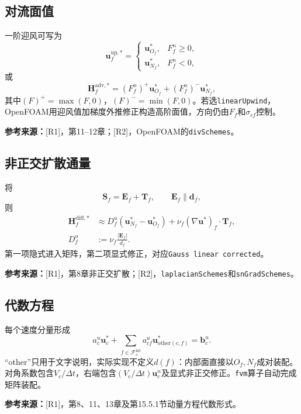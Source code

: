 \documentclass[UTF8,12pt,a4paper]{ctexart}
\numberwithin{equation}{section}
\newcommand{\dt}{\Delta t}
\newcommand{\Rone}{\textnormal{[R1]}}
\newcommand{\Rtwo}{\textnormal{[R2]}}
\newcommand{\source}[1]{\par\smallskip\noindent\colorbox{sourcebg}{%
  \parbox{0.955\linewidth}{\footnotesize\color{sourcegray}\textbf{参考来源：}#1}}\par\smallskip}
\begin{document}
\subsection{对流面值}
一阶迎风可写为
\begin{equation}
  \bm u_f^{\mathrm{up},*}=
  \begin{cases}
    \bm u_{O_f}^*,&F_f^n\ge0,\\
    \bm u_{N_f}^*,&F_f^n<0,
  \end{cases}
\end{equation}
或
\begin{equation}
  \boxed{\bm H_f^{\mathrm{adv},*}
  =(F_f^n)^+\bm u_{O_f}^*+(F_f^n)^-\bm u_{N_f}^*,}
  \label{eq:upwind_momentum_flux}
\end{equation}
其中$(F)^+=\max(F,0)$，$(F)^-=\min(F,0)$。若选\texttt{linearUpwind}，OpenFOAM用迎风值加梯度外推修正构造高阶面值，方向仍由$F_f$和$\sigma_{cf}$控制。
\source{\Rone，第11--12章；\Rtwo，OpenFOAM的\texttt{divSchemes}。}

\subsection{非正交扩散通量}
将
\begin{equation}
  \bm S_f=\bm E_f+\bm T_f,\qquad \bm E_f\parallel\bm d_f,
  \label{eq:nonorth_decomp}
\end{equation}
则
\begin{align}
  \bm H_f^{\mathrm{diff},*}
  &\approx D_f^u(\bm u_{N_f}^*-\bm u_{O_f}^*)
  +\nu_f(\nabla\bm u^*)_f\cdot\bm T_f,
  \label{eq:diff_flux_nonorth}\\
  D_f^u&:=\nu_f\frac{|\bm E_f|}{d_f}.
\end{align}
第一项隐式进入矩阵，第二项显式修正，对应\texttt{Gauss linear corrected}。
\source{\Rone，第8章非正交扩散；\Rtwo，\texttt{laplacianSchemes}和\texttt{snGradSchemes}。}

\subsection{代数方程}
每个速度分量形成
\begin{equation}
  \boxed{a_c^u\bm u_c^*+
  \sum_{f\in\mathcal F_c^{\mathrm{int}}}
  a_{cf}^u\bm u_{\mathrm{other}(c,f)}^*=\bm b_c^u.}
  \label{eq:predictor_algebra}
\end{equation}
“other”只用于文字说明，实际实现不定义$d(f)$：内部面直接以$O_f,N_f$成对装配。对角系数包含$V_c/\dt$，右端包含$(V_c/\dt)\bm u_c^n$及显式非正交修正。\texttt{fvm}算子自动完成矩阵装配。
\source{\Rone，第8、11、13章及第15.5.1节动量方程代数形式。}
\end{document}
